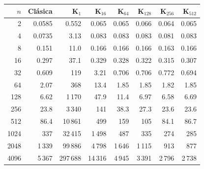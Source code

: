 \begin{tabular}{rrrrrrrr}
    \toprule
    $n$  & Clásica & K$_{1}$  & K$_{16}$ & K$_{64}$ & K$_{128}$ & K$_{256}$ & K$_{512}$ \\
    \midrule
    2    & 0.0585  & 0.552    & 0.065    & 0.065    & 0.066     & 0.064     & 0.065     \\
    4    & 0.0735  & 3.13     & 0.083    & 0.083    & 0.083     & 0.081     & 0.083     \\
    8    & 0.151   & 11.0     & 0.166    & 0.166    & 0.166     & 0.163     & 0.166     \\
    16   & 0.297   & 37.1     & 0.329    & 0.328    & 0.322     & 0.315     & 0.307     \\
    32   & 0.609   & 119      & 3.21     & 0.706    & 0.706     & 0.772     & 0.694     \\
    64   & 2.07    & 368      & 13.4     & 1.85     & 1.85      & 1.82      & 1.85      \\
    128  & 6.62    & 1\,170   & 47.9     & 11.4     & 6.97      & 6.58      & 6.69      \\
    256  & 23.8    & 3\,340   & 141      & 38.3     & 27.3      & 23.6      & 23.6      \\
    512  & 86.4    & 10\,861  & 499      & 159      & 105       & 84.1      & 86.7      \\
    1024 & 337     & 32\,415  & 1\,498   & 487      & 335       & 274       & 285       \\
    2048 & 1\,339  & 99\,886  & 4\,798   & 1\,646   & 1\,115    & 913       & 877       \\
    4096 & 5\,367  & 297\,688 & 14\,316  & 4\,945   & 3\,391    & 2\,796    & 2\,738    \\
    \bottomrule
\end{tabular}